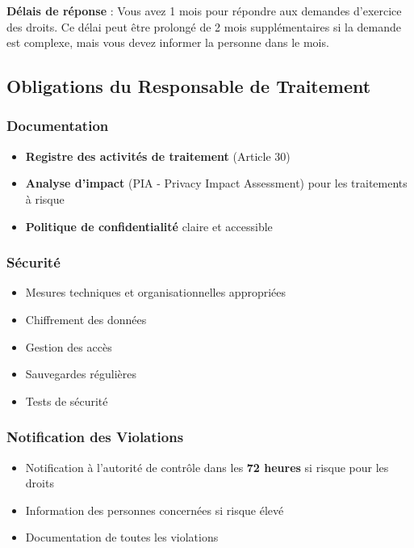 \documentclass[11pt,a4paper]{article}
\begin{document}
\begin{legalbox}
\textbf{Délais de réponse} : Vous avez 1 mois pour répondre aux demandes d'exercice des droits. Ce délai peut être prolongé de 2 mois supplémentaires si la demande est complexe, mais vous devez informer la personne dans le mois.
\end{legalbox}

\subsection{Obligations du Responsable de Traitement}

\subsubsection{Documentation}
\begin{itemize}
    \item \textbf{Registre des activités de traitement} (Article 30)
    \item \textbf{Analyse d'impact} (PIA - Privacy Impact Assessment) pour les traitements à risque
    \item \textbf{Politique de confidentialité} claire et accessible
\end{itemize}

\subsubsection{Sécurité}
\begin{itemize}
    \item Mesures techniques et organisationnelles appropriées
    \item Chiffrement des données
    \item Gestion des accès
    \item Sauvegardes régulières
    \item Tests de sécurité
\end{itemize}

\subsubsection{Notification des Violations}
\begin{itemize}
    \item Notification à l'autorité de contrôle dans les \textbf{72 heures} si risque pour les droits
    \item Information des personnes concernées si risque élevé
    \item Documentation de toutes les violations
\end{itemize}
\end{document}
